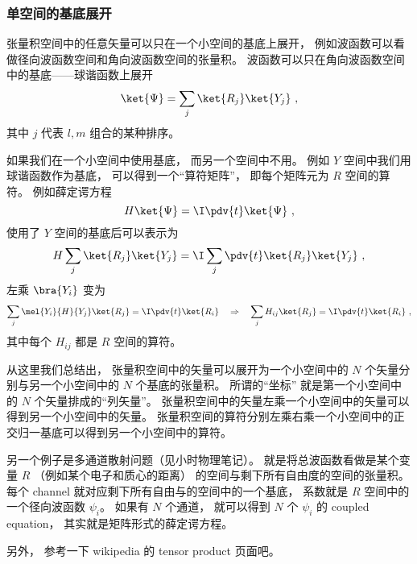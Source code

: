 \subsubsection{单空间的基底展开}
张量积空间中的任意矢量可以只在一个小空间的基底上展开， 例如波函数可以看做径向波函数空间和角向波函数空间的张量积。 波函数可以只在角向波函数空间中的基底——球谐函数上展开
\begin{equation}
\ket{\Psi} = \sum_j \ket{R_j}\ket{Y_j}~,
\end{equation}
其中 $j$ 代表 $l, m$ 组合的某种排序。

如果我们在一个小空间中使用基底， 而另一个空间中不用。 例如 $Y$ 空间中我们用球谐函数作为基底， 可以得到一个“算符矩阵”， 即每个矩阵元为 $R$ 空间的算符。 例如薛定谔方程
\begin{equation}
H \ket{\Psi} = \I \pdv{t}  \ket{\Psi}~,
\end{equation}
使用了 $Y$ 空间的基底后可以表示为
\begin{equation}
H \sum_j \ket{R_j}\ket{Y_j} =  \I  \sum_j\pdv{t}  \ket{R_j}\ket{Y_j}~,
\end{equation}
左乘 $\bra{Y_i}$ 变为
\begin{equation}
\sum_j \mel{Y_i}{H}{Y_j} \ket{R_j} =  \I  \pdv{t}  \ket{R_i}
\quad\Rightarrow\quad
\sum_j H_{ij} \ket{R_j} =  \I  \pdv{t}  \ket{R_i}~,
\end{equation}
其中每个 $H_{ij}$ 都是 $R$ 空间的算符。

从这里我们总结出， 张量积空间中的矢量可以展开为一个小空间中的 $N$ 个矢量分别与另一个小空间中的 $N$ 个基底的张量积。 所谓的“坐标” 就是第一个小空间中的 $N$ 个矢量排成的“列矢量”。 张量积空间中的矢量左乘一个小空间中的矢量可以得到另一个小空间中的矢量。 张量积空间的算符分别左乘右乘一个小空间中的正交归一基底可以得到另一个小空间中的算符。

另一个例子是多通道散射问题（见小时物理笔记）。 就是将总波函数看做是某个变量 $R$ （例如某个电子和质心的距离） 的空间与剩下所有自由度的空间的张量积。 每个 channel 就对应剩下所有自由与的空间中的一个基底， 系数就是 $R$ 空间中的一个径向波函数 $\psi_i$。 如果有 $N$ 个通道， 就可以得到 $N$ 个 $\psi_i$ 的 coupled equation， 其实就是矩阵形式的薛定谔方程。

另外， 参考一下 wikipedia 的 tensor product 页面吧。
